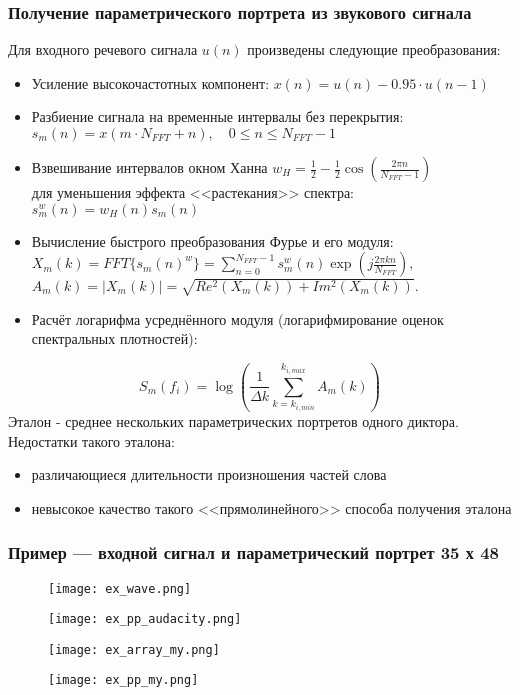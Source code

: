\begin{frame}
	\frametitle{\small Получение параметрического портрета из звукового сигнала}
	\scriptsize
	\vfill
	Для входного речевого сигнала $u(n)$ произведены следующие преобразования:
	\vfill
	\begin{itemize}
		\item Усиление высокочастотных компонент: $x(n) = u(n) - 0.95 \cdot u(n-1)$
		\item Разбиение сигнала на временные интервалы без перекрытия:
		$s_m(n) = x(m \cdot N_{FFT} + n), \quad 0 \le n \le N_{FFT} - 1$
		\item Взвешивание интервалов окном Ханна $w_H = \frac{1}{2} - \frac{1}{2} \cos \left(\frac{2 \pi n}{N_{FFT} - 1} \right)$ \\
		для уменьшения эффекта <<растекания>> спектра: $s_m^{w}(n) = w_H(n) s_m(n)$ \\
		\item Вычисление быстрого преобразования Фурье и его модуля:
		$X_m(k) = FFT\{ s_m(n)^w \} = \sum_{n=0}^{N_{FFT} - 1} s_m^{w}(n) \exp{\left(j\frac{2 \pi k n}{N_{FFT}} \right)},$
		$A_m(k) = |X_m(k)| = \sqrt{Re^2(X_m(k)) + Im^2(X_m(k))}.$
		\item Расчёт логарифма усреднённого модуля (логарифмирование оценок спектральных плотностей):
	\end{itemize}
	$$S_m(f_i) = \log\left(\frac{1}{\Delta k} \sum_{k=k_{i,min}}^{k_{i,max}} A_m(k)\right)$$
	\vfill
	\footnotesize
	Эталон - среднее нескольких параметрических портретов одного диктора. \\
	Недостатки такого эталона:
	\scriptsize
	\begin{itemize}
		\item различающиеся длительности произношения частей слова
		\item невысокое качество такого <<прямолинейного>> способа получения эталона
	\end{itemize}
	\vfill
\end{frame}

\begin{frame}
	\frametitle{\small Пример --- входной сигнал и параметрический портрет 35 х 48}
	\begin{figure}[h]
		\texttt{[image: ex\_wave.png]}
	\end{figure}
	\begin{figure}[h]
		\texttt{[image: ex\_pp\_audacity.png]}
	\end{figure}
	\begin{figure}
		\centering
		\begin{minipage}{0.5\textwidth}
			\centering
			\texttt{[image: ex\_array\_my.png]}
		\end{minipage}\hfill
		\begin{minipage}{0.5\textwidth}
			\centering
			\texttt{[image: ex\_pp\_my.png]}
		\end{minipage}
	\end{figure}
	\vfill
\end{frame}

